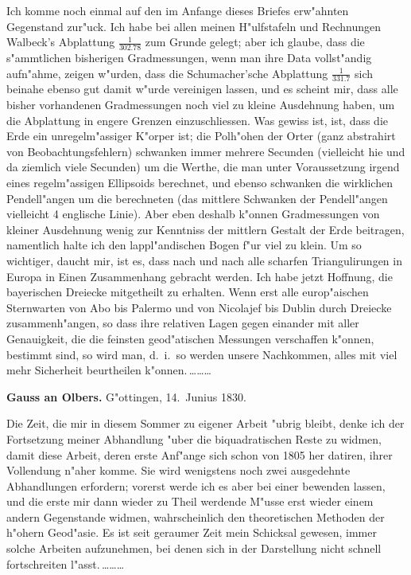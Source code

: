 \documentclass[12pt,a4paper]{article}
\theoremstyle{plain}
\theoremstyle{definition}
\theoremstyle{remark}
\begin{document}
\newpage
\noindent Ich komme noch einmal auf den im Anfange dieses Briefes erw"ahnten Gegenstand zur"uck. Ich habe bei allen meinen H"ulfstafeln und Rechnungen Walbeck's Abplattung $\frac{1}{302.78}$ zum Grunde gelegt; aber ich glaube, dass die s"ammtlichen bisherigen Gradmessungen, wenn man ihre Data vollst"andig aufn"ahme, zeigen w"urden, dass die Schumacher'sche Abplattung $\frac{1}{331.7}$ sich beinahe ebenso gut damit w"urde vereinigen lassen, und es scheint mir, dass alle bisher vorhandenen Gradmessungen noch viel zu kleine Ausdehnung haben, um die Abplattung in engere Grenzen einzuschliessen. Was gewiss ist, ist, dass die Erde ein unregelm"assiger K"orper ist; die Polh"ohen der Orter (ganz abstrahirt von Beobachtungsfehlern) schwanken immer mehrere Secunden (vielleicht hie und da ziemlich viele Secunden) um die Werthe, die man unter Voraussetzung irgend eines regelm"assigen Ellipsoids berechnet, und ebenso schwanken die wirklichen Pendell"angen um die berechneten (das mittlere Schwanken der Pendell"angen vielleicht 4 englische Linie). Aber eben deshalb k"onnen Gradmessungen von kleiner Ausdehnung wenig zur Kenntniss der mittlern Gestalt der Erde beitragen, namentlich halte ich den lappl"andischen Bogen f"ur viel zu klein. Um so wichtiger, daucht mir, ist es, dass nach und nach alle scharfen Triangulirungen in Europa in Einen Zusammenhang gebracht werden. Ich habe jetzt Hoffnung, die bayerischen Dreiecke mitgetheilt zu erhalten. Wenn erst alle europ"aischen Sternwarten von Abo bis Palermo und von Nicolajef bis Dublin durch Dreiecke zusammenh"angen, so dass ihre relativen Lagen gegen einander mit aller Genauigkeit, die die feinsten geod"atischen Messungen verschaffen k"onnen, bestimmt sind, so wird man, d.\ i.\ so werden unsere Nachkommen, alles mit viel mehr Sicherheit beurtheilen k"onnen.\,\ldots\ldots\ldots

\newpage
\noindent \textbf{Gauss an Olbers.} G"ottingen, 14.~Junius 1830.

\medskip
\noindent Die Zeit, die mir in diesem Sommer zu eigener Arbeit "ubrig bleibt, denke ich der Fortsetzung meiner Abhandlung "uber die biquadratischen Reste zu widmen, damit diese Arbeit, deren erste Anf"ange sich schon von 1805 her datiren, ihrer Vollendung n"aher komme. Sie wird wenigstens noch zwei ausgedehnte Abhandlungen erfordern; vorerst werde ich es aber bei einer bewenden lassen, und die erste mir dann wieder zu Theil werdende M"usse erst wieder einem andern Gegenstande widmen, wahrscheinlich den theoretischen Methoden der h"ohern Geod"asie. Es ist seit geraumer Zeit mein Schicksal gewesen, immer solche Arbeiten aufzunehmen, bei denen sich in der Darstellung nicht schnell fortschreiten l"asst.\,\ldots\ldots\ldots
\end{document}
